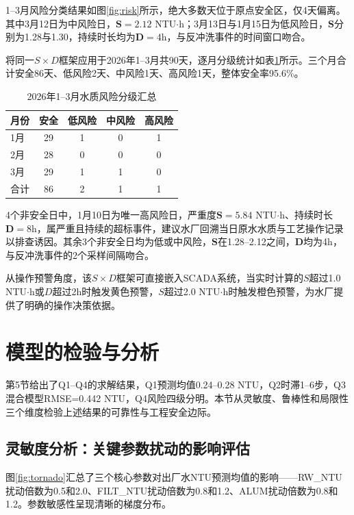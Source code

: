 \documentclass{cumcmthesis}
\begin{document}
1--3月风险分类结果如图\ref{fig:risk}所示，绝大多数天位于原点安全区，仅4天偏离。其中3月12日为中风险日，$\mathbf{S}=2.12$ NTU$\cdot$h；3月13日与1月15日为低风险日，$\mathbf{S}$分别为1.28与1.30，持续时长均为$\mathbf{D}=4$h，与反冲洗事件的时间窗口吻合。

将同一$S\times D$框架应用于2026年1--3月共90天，逐月分级统计如表\ref{tab:q4_summary}所示。三个月合计安全86天、低风险2天、中风险1天、高风险1天，整体安全率95.6\%。

\begin{table}[H]
\centering
\caption{2026年1--3月水质风险分级汇总}
\label{tab:q4_summary}
\begin{tabular}{@{}lcccc@{}}
\toprule
月份 & 安全 & 低风险 & 中风险 & 高风险 \\
\midrule
1月 & 29 & 1 & 0 & 1 \\
2月 & 28 & 0 & 0 & 0 \\
3月 & 29 & 1 & 1 & 0 \\
\midrule
合计 & 86 & 2 & 1 & 1 \\
\bottomrule
\end{tabular}
\end{table}

4个非安全日中，1月10日为唯一高风险日，严重度$\mathbf{S}=5.84$ NTU$\cdot$h、持续时长$\mathbf{D}=8$h，属严重且持续的超标事件，建议水厂回溯当日原水水质与工艺操作记录以排查诱因。其余3个非安全日均为低或中风险，$\mathbf{S}$在1.28--2.12之间，$\mathbf{D}$均为4h，与反冲洗事件的2个采样间隔吻合。

从操作预警角度，该$S\times D$框架可直接嵌入SCADA系统，当实时计算的$S$超过1.0 NTU$\cdot$h或$D$超过2h时触发黄色预警，$S$超过2.0 NTU$\cdot$h时触发橙色预警，为水厂提供了明确的操作决策依据。


\section{模型的检验与分析}

第5节给出了Q1--Q4的求解结果，Q1预测均值0.24--0.28 NTU，Q2时滞1--6步，Q3混合模型RMSE=0.442 NTU，Q4风险四级分明。本节从灵敏度、鲁棒性和局限性三个维度检验上述结果的可靠性与工程安全边际。

\subsection{灵敏度分析：关键参数扰动的影响评估}
图\ref{fig:tornado}汇总了三个核心参数对出厂水NTU预测均值的影响——RW\_NTU扰动倍数为0.5和2.0、FILT\_NTU扰动倍数为0.8和1.2、ALUM扰动倍数为0.8和1.2。参数敏感性呈现清晰的梯度分布。
\end{document}
